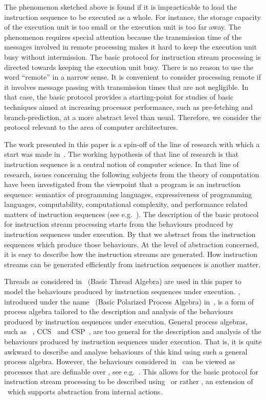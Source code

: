 \documentclass[fleqn]{llncs}
\begin{document}
The phenomenon sketched above is found if it is impracticable to load the
instruction sequence to be executed as a whole.
For instance, the storage capacity of the execution unit is too small or
the execution unit is too far away.
The phenomenon requires special attention because the transmission time
of the messages involved in remote processing makes it hard to keep the
execution unit busy without intermission.
The basic protocol for instruction stream processing is directed towards
keeping the execution unit busy.
There is no reason to use the word ``remote'' in a narrow sense.
It is convenient to consider processing remote if it involves message
passing with transmission times that are not negligible.
In that case, the basic protocol provides a starting-point for studies
of basic techniques aimed at increasing processor performance, such as
pre-fetching and branch-prediction, at a more abstract level than usual.
Therefore, we consider the protocol relevant to the area of computer
architectures.

The work presented in this paper is a spin-off of the line of research
with which a start was made in~\cite{BL02a}.
The working hypothesis of that line of research is that instruction
sequence is a central notion of computer science.
In that line of research, issues concerning the following subjects from
the theory of computation have been investigated from the viewpoint that
a program is an instruction sequence: semantics of programming
languages, expressiveness of programming languages, computability,
computational complexity, and performance related matters of instruction
sequences (see e.g.~\cite{BM07e,BM07g,BP04a,BM08g,BM07f}).
The description of the basic protocol for instruction stream processing
starts from the behaviours produced by instruction sequences under
execution.
By that we abstract from the instruction sequences which produce those
behaviours.
At the level of abstraction concerned, it is easy to describe how the
instruction streams are generated.
How instruction streams can be generated efficiently from instruction
sequences is another matter.

Threads as considered in \BTA\ (Basic Thread Algebra) are used in this
paper to model the behaviours produced by instruction sequences under
execution.
\BTA, introduced under the name \BPPA\ (Basic Polarized Process Algebra)
in~\cite{BL02a}, is a form of process algebra tailored to the
description and analysis of the behaviours produced by instruction
sequences under execution.
General process algebras, such as \ACP~\cite{BK84b,BW90},
CCS~\cite{HM85,Mil89} and CSP~\cite{BHR84,Hoa85}, are too general for
the description and analysis of the behaviours produced by instruction
sequences under execution.
That is, it is quite awkward to describe and analyse behaviours of this
kind using such a general process algebra.
However, the behaviours considered in \BTA\ can be viewed as processes
that are definable over \ACP, see e.g.~\cite{BM05c}.
This allows for the basic protocol for instruction stream processing to
be described using \ACP\ or rather \ACPt, an extension of \ACP\ which
supports abstraction from internal actions.
\end{document}
